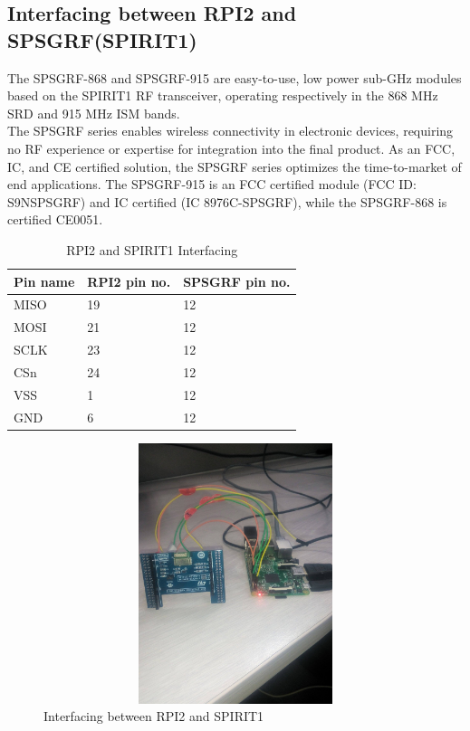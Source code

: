 \subsection{Interfacing between RPI2 and SPSGRF(SPIRIT1)}
The SPSGRF-868 and SPSGRF-915 are easy-to-use, low power sub-GHz modules based on the SPIRIT1 RF transceiver, operating respectively in the 868 MHz SRD and 915 MHz ISM bands.\\
The SPSGRF series enables wireless connectivity in electronic devices, requiring no RF experience or expertise for integration into the final product. As an FCC, IC, and CE certified solution, the SPSGRF series optimizes the time-to-market of end applications. The SPSGRF-915 is an FCC certified module (FCC ID: S9NSPSGRF) and IC certified (IC 8976C-SPSGRF), while the SPSGRF-868 is certified CE0051.
\begin{table}[ht]
	\centering
	\scalebox{1}
	{
		\begin{tabular}{|K{3cm} | K{2cm} | K{5cm}|}
		\toprule
		\textbf{Pin name} & \textbf{RPI2 pin no.} & \textbf{SPSGRF pin no.} \\
		\hline
		MISO & 19 & 12 \\
		\hline
		MOSI & 21 & 12 \\
		\hline
		SCLK & 23 & 12 \\
		\hline
		CSn & 24 & 12 \\
		\hline
		VSS & 1 & 12 \\
		\hline
		GND & 6 & 12 \\
		\bottomrule
		\end{tabular}
	}
	\caption{RPI2 and SPIRIT1 Interfacing}
\end{table}
\begin{figure}[H]
	\centering
	\includegraphics[width=4.5in, height=3in]{images/interfacing.jpg}
	\caption{Interfacing between RPI2 and SPIRIT1}
\end{figure}

